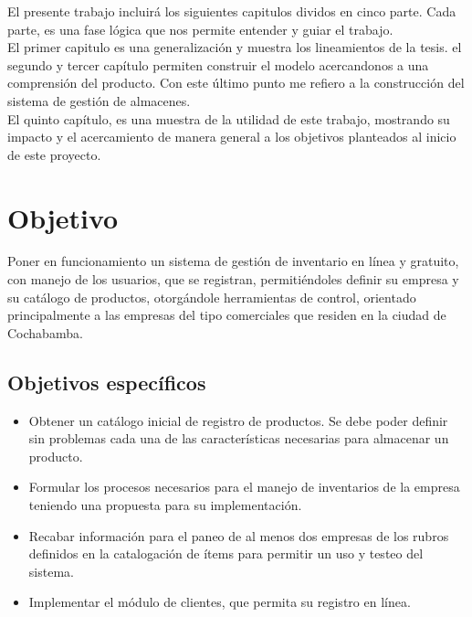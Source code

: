 El presente trabajo incluirá los siguientes capitulos dividos en cinco parte. Cada parte, es una fase lógica que nos permite entender y guiar el trabajo.\\

El primer capitulo es una generalización y muestra los lineamientos de la tesis. el segundo y tercer capítulo permiten construir el modelo acercandonos a una comprensión del producto. Con este último punto me refiero a la construcción del sistema de gestión de almacenes.\\

El quinto capítulo, es una muestra de la utilidad de este trabajo, mostrando su impacto y el acercamiento de manera general a los objetivos planteados al inicio de este proyecto.\\


\section{Objetivo}

Poner en funcionamiento un sistema de gestión de inventario en línea y gratuito, con manejo de los usuarios, que se registran, permitiéndoles definir su empresa y su catálogo de productos, otorgándole herramientas de control, orientado principalmente a las empresas del tipo comerciales que residen en la ciudad de Cochabamba.\\

\subsection{Objetivos específicos}

\begin{itemize}

\item Obtener un catálogo inicial de registro de productos. Se debe poder definir sin problemas cada una de las características necesarias para almacenar un producto.
\item Formular los procesos  necesarios para el manejo de inventarios de la empresa teniendo una propuesta para su implementación.
\item Recabar información para el paneo de al menos dos empresas de los rubros definidos en la catalogación de ítems para permitir un uso y testeo del sistema.
\item Implementar el módulo de clientes, que permita su registro en línea.

\end{itemize}

